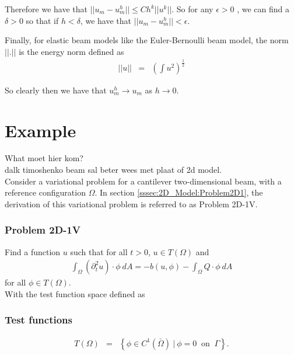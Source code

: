 \documentclass[../../main.tex]{subfiles}
\begin{document}
Therefore we have that $||u_{m} -  u_{m}^{h}|| \leq Ch^{k}||u^{k}||$. So for any $\epsilon >0$ , we can find a $\delta >0$ so that if $h < \delta$, we have that $||u_{m} -  u_{m}^{h}|| < \epsilon$.

Finally, for elastic beam models like the Euler-Bernoulli beam model, the norm $||.||$ is the energy norm defined as
\begin{eqnarray*}
||u|| &=& \left(\int u^{2}\right)^{\frac{1}{2}}
\end{eqnarray*}


So clearly then we have that $u_{m}^{h} \rightarrow u_{m}$ as $h \rightarrow 0$.

\section{Example}
What moet hier kom?\\

dalk timoshenko beam sal beter wees met plaat of 2d model.\\

Consider a variational problem for a cantilever two-dimensional beam, with a reference configuration $\Omega$. In section \ref{sssec:2D_Model:Problem2D1}, the derivation of this variational problem is referred to as Problem 2D-1V.

\subsubsection{Problem 2D-1V}\label{sssec:2D_Model:Problem2D1V}
Find a function $u$ such that for all $t>0$, $u \in T(\Omega)$ and 
\begin{align}
	\int_{\Omega} (\partial_t^2 u)\cdot \phi \ dA = -b(u,\phi) - \int_{\Omega} Q\cdot\phi \ dA \label{eq:2D_Model:Problem2D1VEq}
\end{align}
for all $\phi \in T(\Omega)$.\\

With the test function space defined as
\subsubsection{Test functions}
\begin{eqnarray*}
	T(\Omega) & = & \left\{ \phi \in C^1(\bar{\Omega}) \ | \ \phi = 0 \ \textrm{ on } \ \Gamma \right\}.
\end{eqnarray*}
\end{document}
